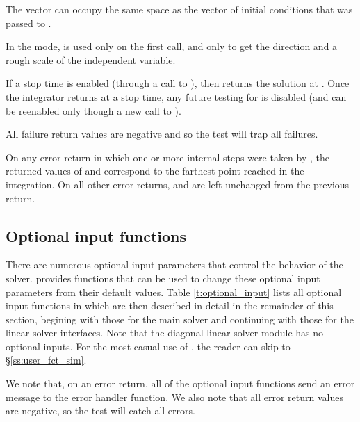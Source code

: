 {
  The vector  can occupy the same space as the vector  of
  initial conditions that was passed to .

  In the  mode,  is used only on the first call,
  and only to get the direction and a rough scale of the independent variable.

  If a stop time is enabled (through a call to ), then
   returns the solution at . Once the integrator returns
  at a stop time, any future testing for  is disabled (and can be
  reenabled only though a new call to ).
  
  All failure return values are negative and so the test 
  will trap all  failures.

  On any error return in which one or more internal steps were taken by
  , the returned values of  and  correspond to
  the farthest point reached in the integration.  On all other error returns,
   and  are left unchanged from the previous 
  return.

}

\subsection{Optional input functions}\label{ss:optional_input}

There are numerous optional input parameters that control the behavior
of the {\cvode} solver.  {\cvode} provides functions that can be used to change
these optional input parameters from their default values.
Table \ref{t:optional_input} lists all optional input functions in {\cvode} which
are then described in detail in the remainder of this section, begining with those
for the main {\cvode} solver and continuing with those for the linear
solver interfaces.  Note that the diagonal linear solver module has no
optional inputs.  For the most casual use of {\cvode}, the reader
can skip to \S\ref{ss:user_fct_sim}.

We note that, on an error return, all of the optional input functions send an
error message to the error handler function. 
We also note that all error return values are negative, so the test 
will catch all errors.

